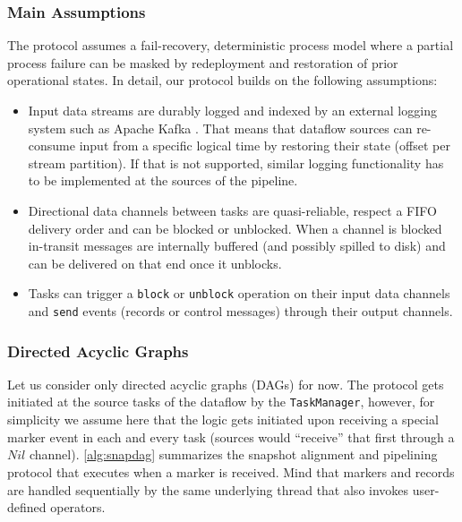 \subsubsection{Main Assumptions}

The protocol assumes a fail-recovery, deterministic process model \cite{elnozahy2002survey} where a partial process failure can be masked by redeployment and restoration of prior operational states. In detail, our protocol builds on the following assumptions:

\begin{itemize}
	\item Input data streams are durably logged and indexed by an external logging system such as Apache Kafka \cite{kreps2011kafka}. That means that dataflow sources can re-consume input from a specific logical time by restoring their state (offset per stream partition). If that is not supported, similar logging functionality has to be implemented at the sources of the pipeline. 
	\item Directional data channels between tasks are quasi-reliable, respect a FIFO delivery order and can be blocked or unblocked. When a channel is blocked in-transit messages are internally buffered (and possibly spilled to disk) and can be delivered on that end once it unblocks.
	\item Tasks can trigger a \texttt{block} or \texttt{unblock} operation on their input data channels and \texttt{send} events (records or control messages) through their output channels.
\end{itemize}

\subsubsection{Directed Acyclic Graphs}

Let us consider only directed acyclic graphs (DAGs) for now. The protocol gets initiated at the source tasks of the dataflow by the \texttt{TaskManager}, however, for simplicity we assume here that the logic gets initiated upon receiving a special marker event in each and every task (sources would ``receive'' that first through a $Nil$ channel). \autoref{alg:snapdag} summarizes the snapshot alignment and pipelining protocol that executes when a marker is received. Mind that markers and records are handled sequentially by the same underlying thread that also invokes user-defined operators. 

